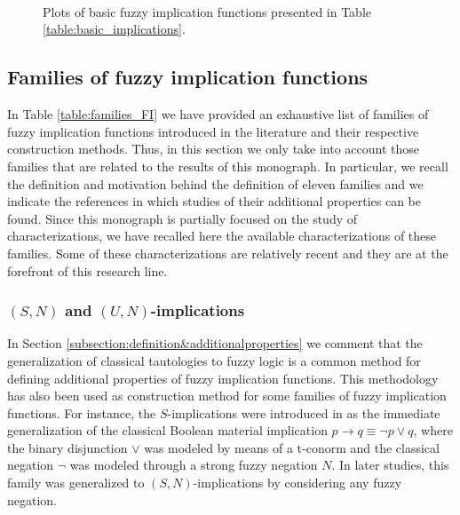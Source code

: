 \begin{figure}[htp!]
	\centering
	\\
	\\
	\\
	\caption{Plots of basic fuzzy implication functions presented in Table \ref{table:basic_implications}.}\label{fig:basic_implications}
\end{figure}

\subsection{Families of fuzzy implication functions}\label{subsection:families}

In Table \ref{table:families_FI} we have provided an exhaustive list of families of fuzzy implication functions introduced in the literature and their respective construction methods. Thus, in this section we only take into account those families that are related to the results of this monograph. In particular, we recall the definition and motivation behind the definition of eleven families and we indicate the references in which studies of their additional properties can be found. Since this monograph is partially focused on the study of characterizations, we have recalled here the available characterizations of these families. Some of these characterizations are relatively recent and they are at the forefront of this research line.

\subsubsection{$(S,N)$ and $(U,N)$-implications}

In Section \ref{subsection:definition&additionalproperties} we comment that the generalization of classical tautologies to fuzzy logic is a common method for defining additional properties of fuzzy implication functions. This methodology has also been used as construction method for some families of fuzzy implication functions. For instance, the $S$-implications were introduced in \cite{Trillas1985} as the immediate generalization of the classical Boolean material implication $p \to q \equiv \neg p \vee q$, where the binary disjunction  $\vee $ was modeled by means of a t-conorm and the classical negation $\neg$ was modeled through a strong fuzzy negation $N$. In later studies, this family was generalized to $(S,N)$-implications by considering any fuzzy negation.


